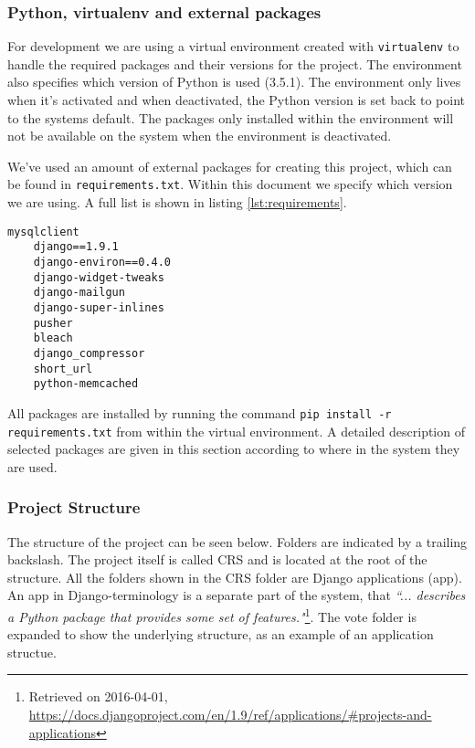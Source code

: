\subsubsection*{Python, virtualenv and external packages}
For development we are using a virtual environment created with \texttt{virtualenv} to handle the required packages and their versions for the project. The environment also specifies which version of Python is used (3.5.1). The environment only lives when it's activated and when deactivated, the Python version is set back to point to the systems default. The packages only installed within the environment will not be available on the system when the environment is deactivated. 

We've used an amount of external packages for creating this project, which can be found in \texttt{requirements.txt}. Within this document we specify which version we are using. A full list is shown in listing \ref{lst:requirements}.

\begin{lstlisting}[caption=The requirements.txt file. A omitted version number means the newest one is used., label=lst:requirements]
    mysqlclient
    django==1.9.1
    django-environ==0.4.0
    django-widget-tweaks
    django-mailgun
    django-super-inlines
    pusher
    bleach
    django_compressor
    short_url
    python-memcached
\end{lstlisting}

All packages are installed by running the command \texttt{pip install -r requirements.txt} from within the virtual environment. A detailed description of selected packages are given in this section according to where in the system they are used.

\subsubsection*{Project Structure}
The structure of the project can be seen below. Folders are indicated by a trailing backslash. The project itself is called CRS and is located at the root of the structure. All the folders shown in the CRS folder are Django applications (app). An app in Django-terminology is a separate part of the system, that \emph{“... describes a Python package that provides some set of features."}\footnote{Retrieved on 2016-04-01, \url{https://docs.djangoproject.com/en/1.9/ref/applications/\#projects-and-applications}}. The vote folder is expanded to show the underlying structure, as an example of an application structue.

